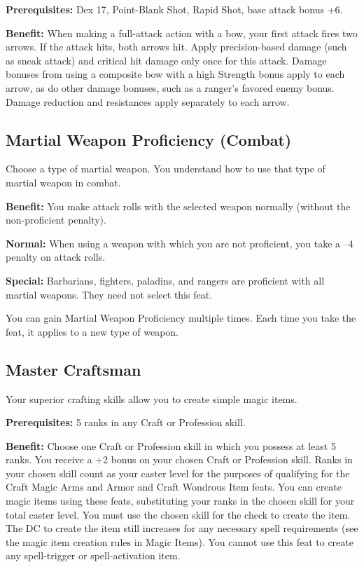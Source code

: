 \textbf{Prerequisites:} Dex 17, Point-Blank Shot, Rapid Shot, base attack bonus +6.
				
\textbf{Benefit:} When making a full-attack action with a bow, your first attack fires two arrows. If the attack hits, both arrows hit. Apply precision-based damage (such as sneak attack) and critical hit damage only once for this attack. Damage bonuses from using a composite bow with a high Strength bonus apply to each arrow, as do other damage bonuses, such as a ranger's favored enemy bonus. Damage reduction and resistances apply separately to each arrow.
				
\subsection{Martial Weapon Proficiency (Combat)}

				
Choose a type of martial weapon. You understand how to use that type of martial weapon in combat.
				
\textbf{Benefit:} You make attack rolls with the selected weapon normally (without the non-proficient penalty).
				
\textbf{Normal:} When using a weapon with which you are not proficient, you take a --4 penalty on attack rolls.
				
\textbf{Special:} Barbarians, fighters, paladins, and rangers are proficient with all martial weapons. They need not select this feat.

You can gain Martial Weapon Proficiency multiple times. Each time you take the feat, it applies to a new type of weapon. 
				
\subsection{Master Craftsman}

				
Your superior crafting skills allow you to create simple magic items.
				
\textbf{Prerequisites:} 5 ranks in any Craft or Profession skill.
				
\textbf{Benefit:} Choose one Craft or Profession skill in which you possess at least 5 ranks. You receive a +2 bonus on your chosen Craft or Profession skill. Ranks in your chosen skill count as your caster level for the purposes of qualifying for the Craft Magic Arms and Armor and Craft Wondrous Item feats. You can create magic items using these feats, substituting your ranks in the chosen skill for your total caster level. You must use the chosen skill for the check to create the item. The DC to create the item still increases for any necessary spell requirements (see the magic item creation rules in Magic Items). You cannot use this feat to create any spell-trigger or spell-activation item.
				

